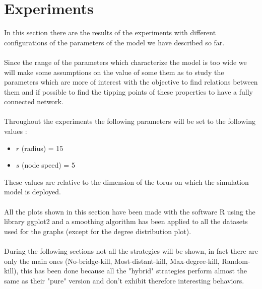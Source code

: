 \documentclass{llncs}
\begin{document}
\section{Experiments}
%
In this section there are the results of the experiments with different configurations of the parameters of the model we have described so far.\\\\
%
Since the range of the parameters which characterize the model is too wide we will make some assumptions on the value of some them as to study the parameters which are more of interest with the objective to find relations between them and if possible to find the tipping points of these properties to have a fully connected network.\\\\
%
Throughout the experiments the following parameters will be set to the following values : \\
%
\begin{itemize}
	\item $r$ (radius) = 15%
	\item $s$ (node speed) = 5%
\end{itemize}
%
These values are relative to the dimension of the torus on which the simulation model is deployed.
\\\\
All the plots shown in this section have been made with the software R using the library ggplot2 and a smoothing algorithm has been applied to all the datasets used for the graphs (except for the degree distribution plot).
\\\\
During the following sections not all the strategies will be shown, in fact there are only the main ones (No-bridge-kill, Most-distant-kill, Max-degree-kill, Random-kill), this has been done because all the "hybrid" strategies perform almost the same as their "pure" version and don't exhibit therefore interesting behaviors.
\end{document}

